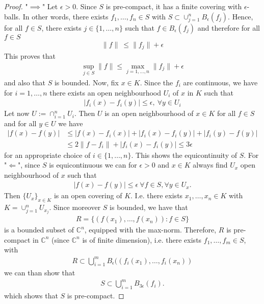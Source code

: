 \documentclass[11pt,a4paper]{article}
\theoremstyle{definition}
\begin{document}
\begin{proof}
"$\implies$" Let $\epsilon >0$. Since $S$ is pre-compact, it has a finite covering with $\epsilon$-balls. In other words, there exists $f_1, \dots , f_n \in S$ with $S \subset \cup_{j=1}^n B_\epsilon(f_j)$. Hence, for all $f \in S$, there exists $j \in \lbrace 1, \dots , n \rbrace$ such that $f \in B_\epsilon ( f_j)$ and therefore for all $f \in S$ 
\begin{align*}
\| f\|\ \leq \| f_j\| + \epsilon
\end{align*}
This proves that 
\begin{align*}
\sup_{j \in S} \|f \| \leq \max_{j=1, \dots , n} \|f_j\| + \epsilon
\end{align*}
and also that $S$ is bounded. Now, fix $x \in K$. Since the $f_i$ are continuous, we have for $i=1, \dots , n$ there exists an open neighbourhood $U_i$ of $x$ in $K$ such that 
\begin{align*}
|f_i(x)-f_i(y)| \leq \epsilon, \ \forall y \in U_i
\end{align*}
Let now $U:= \cap_{i=1}^n U_i$. Then $U$ is an open neighbourhood of $x \in K$ for all $f \in S$ and for all $y \in U$ we have 
\begin{align*}
|f(x)-f(y)| & \leq |f(x)-f_i(x)| + |f_i(x)-f_i(y)| + |f_i(y)-f(y)|  \\
& \leq 2 \|f-f_i\| + |f_i(x)-f_i(y)| \leq 3 \epsilon
\end{align*}
for an appropriate choice of $i \in \lbrace 1, \dots , n\rbrace$. This shows the equicontinuity of $S$. 
\newpage
For "$\Longleftarrow$", since $S$ is equicontinuous we can for $\epsilon >0$ and $x \in K$ always find $U_x$ open neighbourhood of $x$ such that 
\begin{align*}
|f(x)-f(y)| \leq \epsilon \ \forall f \in S, \forall y \in U_x.
\end{align*}
Then $\lbrace U_x\rbrace_{x \in K}$ is an open covering of $K$. I.e. there exists $x_1, \dots , x_n \in K$ with $K = \cup_{j=1}^n U_{x_j}$. Since moreover $S$ is bounded, we have that 
\begin{align*}
R= \lbrace (f(x_1), \dots , f(x_n)) : f \in S \rbrace
\end{align*}
is a bounded subset of $\mathbb{C}^n$, equipped with the max-norm. Therefore, $R$ is pre-compact in $\mathbb{C}^n$ (since $\mathbb{C}^n$ is of finite dimension), i.e. there exists $f_1, \dots , f_m \in S$, with 
\begin{align*}
R \subset \bigcup_{i=1}^m B_\epsilon ( (f_i(x_1), \dots , f_i(x_n))
\end{align*}
we can than show that 
\begin{align*}
S \subset \bigcup_{i=1}^m B_{ 3 \epsilon} (f_i).
\end{align*}
which shows that $S$ is pre-compact. 
\end{proof}
\end{document}
